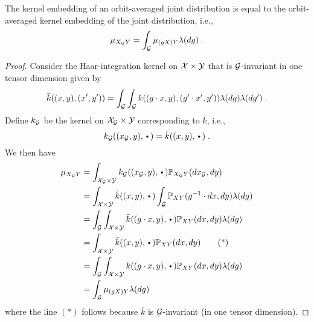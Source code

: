 \begin{proposition} \label{prop:embed}
The kernel embedding of an orbit-averaged joint distribution is equal to the orbit-averaged kernel embedding of the joint distribution, i.e.,
\[
\mu_{X_{\mathcal{G}} Y} = \int_{\mathcal{G}} \mu_{(gX)Y}\lambda(dg)\;.
\]
\end{proposition}
\begin{proof}
Consider the Haar-integration kernel \parencite{Haasdonk:2005} on $\mathcal{X}\times\mathcal{Y}$ that is $\mathcal{G}$-invariant in one tensor dimension given by
\[
\bar{k}((x,y),(x',y'))=\int_{\mathcal{G}}\int_{\mathcal{G}} k((g\cdot x,y), (g'\cdot x',y'))\lambda(dg)\lambda(dg')\;.
\]
Define $k_{\mathcal{G}}$ be the kernel on $\mathcal{X}_{\mathcal{G}}\times\mathcal{Y}$ corresponding to $\bar{k}$, i.e.,
\[
k_\calG((x_\calG,y),\argdot) = \bar{k}((x,y),\argdot) \;.
\]
We then have
\begin{align*}
\mu_{X_\calG Y} &= \int_{\calX_\calG\times\calY}k_\calG((x_\calG, y),\argdot)\P_{X_\calG Y}(dx_\calG,dy) \\
&= \int_{\calX\times\calY}\bar{k}((x,y),\argdot)\int_\calG\bbP_{XY}(g^{-1}\cdot dx,dy)\lambda(dg) \\
&= \int_\calG\int_{\calX\times\calY}\bar{k}((g\cdot x, y),\argdot)\bbP_{XY}(dx,dy)\lambda(dg) \\
&= \int_{\calX\times\calY}\bar{k}((x,y),\argdot)\bbP_{XY}(dx,dy) \tag{*} \\
&= \int_\calG\int_{\calX\times\calY}k((g\cdot x, y),\argdot)\bbP_{XY}(dx,dy)\lambda(dg) \\
&= \int_\calG\mu_{(gX)Y}\lambda(dg)
\end{align*}
where the line $(*)$ follows because $\bar{k}$ is $\mathcal{G}$-invariant (in one tensor dimension).
\end{proof}

